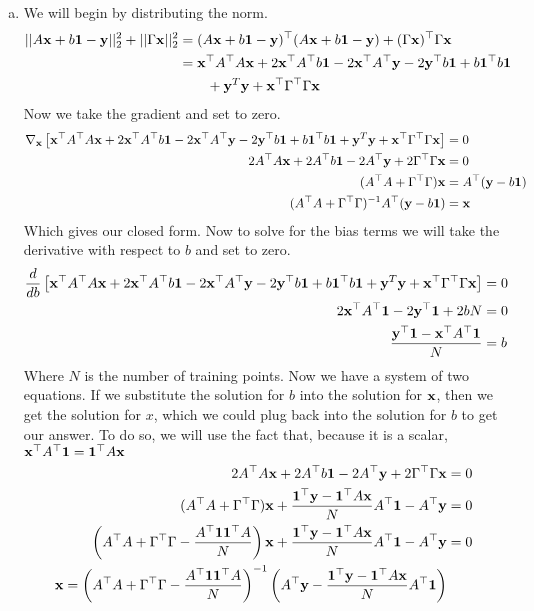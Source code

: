 \documentclass[12pt,letterpaper,fleqn]{hmcpset}
\begin{document}
\begin{enumerate}[(a)]
    \item
        We will begin by distributing the norm.
        \begin{align*}
            ||A{\bf x} + b{\bf 1} -{\bf y}||_2^2 + ||\Gamma{\bf x}||_2^2 &= (A{\bf x} + b{\bf 1} -{\bf y})^\top(A{\bf x} + b{\bf 1} -{\bf y}) + (\Gamma {\bf x})^\top \Gamma {\bf x}\\
            &= {\bf x}^\top A^\top A {\bf x} + 2 {\bf x}^\top A^\top b{\bf 1} - 2 {\bf x}^\top A^\top {\bf y} -2 {\bf y}^\top b{\bf 1} + b{\bf 1}^\top b{\bf 1} \\ &\qquad + {\bf y}^T {\bf y} + {\bf x}^\top \Gamma^\top \Gamma {\bf x}
        \end{align*}
        Now we take the gradient and set to zero.
        \begin{align*}
            \nabla_{\bf x} \left[ {\bf x}^\top A^\top A {\bf x} + 2 {\bf x}^\top A^\top b{\bf 1} - 2 {\bf x}^\top A^\top {\bf y} -2 {\bf y}^\top b{\bf 1} + b{\bf 1}^\top b{\bf 1} + {\bf y}^T {\bf y} + {\bf x}^\top \Gamma^\top \Gamma {\bf x} \right] &= 0\\
            2A^\top A {\bf x} + 2 A^\top b{\bf 1} - 2 A^\top {\bf y} + 2\Gamma^\top \Gamma {\bf x} &= 0 \\
            (A^\top A + \Gamma^\top \Gamma){\bf x} &= A^\top ({\bf y}  - b{\bf 1}) \\
            (A^\top A + \Gamma^\top \Gamma)^{-1}A^\top ({\bf y}  - b{\bf 1}) &= {\bf x}
        \end{align*}
        Which gives our closed form. Now to solve for the bias terms we will take the derivative with respect to $b$ and set to zero.
        \begin{align*}
            \frac{d}{db} \left[  {\bf x}^\top A^\top A {\bf x} + 2 {\bf x}^\top A^\top b{\bf 1} - 2 {\bf x}^\top A^\top {\bf y} -2 {\bf y}^\top b{\bf 1} + b{\bf 1}^\top b{\bf 1} + {\bf y}^T {\bf y} + {\bf x}^\top \Gamma^\top \Gamma {\bf x} \right] &= 0\\
            2 {\bf x}^\top A^\top{\bf 1} -2{\bf y}^\top{\bf 1} +2 b N &= 0 \\
             \frac{{\bf y}^\top{\bf 1} - {\bf x}^\top A^\top{\bf 1}}{N} &= b
        \end{align*}
        Where $N$ is the number of training points. Now we have a system of two equations. If we substitute the solution for $b$ into the solution for ${\bf x}$, then we get the solution for $x$, which we could plug back into the solution for $b$ to get our answer. To do so, we will use the fact that, because it is a scalar, ${\bf x}^\top A^\top{\bf 1} = {\bf 1}^\top A {\bf x}$
        \begin{align*}
            2A^\top A {\bf x} + 2 A^\top b{\bf 1} - 2 A^\top {\bf y} + 2\Gamma^\top \Gamma {\bf x} &= 0 \\
            (A^\top A + \Gamma^\top \Gamma){\bf x} + \frac{{\bf 1}^\top {\bf y} - {\bf 1}^\top A {\bf x}}{N}A^\top {\bf 1} - A^\top {\bf y}  &= 0\\
            \left(A^\top A + \Gamma^\top \Gamma -\frac{A^\top{\bf 1}{\bf 1}^\top A}{N}\right){\bf x} + \frac{{\bf 1}^\top {\bf y} - {\bf 1}^\top A {\bf x}}{N}A^\top {\bf 1} - A^\top {\bf y}  &= 0\\
            {\bf x} =  \left(A^\top A + \Gamma^\top \Gamma -\frac{A^\top{\bf 1}{\bf 1}^\top A}{N}\right)^{-1} \left(A^\top {\bf y} - \frac{{\bf 1}^\top {\bf y} - {\bf 1}^\top A {\bf x}}{N}A^\top {\bf 1} \right)
        \end{align*}


\end{enumerate}
\end{document}
